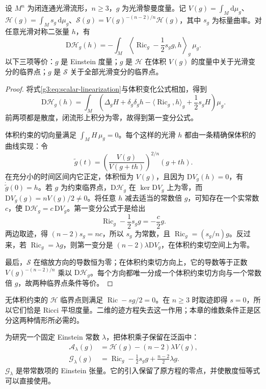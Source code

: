 \begin{theorem}\label{g3:thm:einstein-hilbert-critical}
	设 \(M^n\) 为闭连通光滑流形，\(n\ge3\)，\(g\) 为光滑黎曼度量。记 \(V(g)=\int_M\mathrm d\mu_g\)、\(\mathcal H(g)=\int_Ms_g\,\mathrm d\mu_g\)、\(\mathcal S(g)=V(g)^{-(n-2)/n}\mathcal H(g)\)，其中 \(s_g\) 为标量曲率。对任意光滑对称二张量 \(h\)，有
	\begin{equation}\label{g3:eq:einstein-hilbert-first-variation}
		\mathrm D\mathcal H_g(h)=-\int_M\left\langle\operatorname{Ric}_g-\frac12s_gg,h\right\rangle_g\,\mu_g.
	\end{equation}
	以下三项等价：\(g\) 是 Einstein 度量；\(g\) 是 \(\mathcal H\) 在体积 \(V(g)\) 的度量中关于光滑变分的临界点；\(g\) 是 \(\mathcal S\) 关于全部光滑变分的临界点。
\end{theorem}
\begin{proof}
	将式\eqref{g3:eq:scalar-linearization}与体积变化公式相加，得到
	\[
		\mathrm D\mathcal H_g(h)=\int_M\left(\Delta_gH+\delta_g\delta_gh-\langle\operatorname{Ric}_g,h\rangle_g+\frac12s_gH\right)\mu_g.
	\]
	前两项都是散度，闭流形上积分为零，故得到第一变分公式。

	体积约束的切向量满足 \(\int_MH\,\mu_g=0\)。每个这样的光滑 \(h\) 都由一条精确保体积的曲线实现：令
	\[
		\widetilde g(t)=\left(\frac{V(g)}{V(g+th)}\right)^{2/n}(g+th).
	\]
	在充分小的时间区间内它正定，体积恒为 \(V(g)\)，且因为 \(\mathrm DV_g(h)=0\)，有 \(\dot{\widetilde g}(0)=h\)。若 \(g\) 为约束临界点，\(\mathrm D\mathcal H_g\) 在 \(\ker\mathrm DV_g\) 上为零，而 \(\mathrm DV_g(g)=nV(g)/2\ne0\)。将任意 \(h\) 减去适当的常数倍 \(g\)，可知存在一个实常数 \(c\)，使 \(\mathrm D\mathcal H_g=c\,\mathrm DV_g\)。第一变分公式于是给出
	\[
		\operatorname{Ric}_g-\frac12s_gg=-\frac c2g.
	\]
	两边取迹，得 \((n-2)s_g=nc\)，所以 \(s_g\) 为常数，且 \(\operatorname{Ric}_g=(s_g/n)g\)。反过来，若 \(\operatorname{Ric}_g=\lambda g\)，则第一变分是 \((n-2)\lambda\mathrm DV_g\)，在体积约束切空间上为零。

	最后，\(\mathcal S\) 在缩放方向的导数恒为零；在体积约束切方向上，它的导数等于正数 \(V(g)^{-(n-2)/n}\) 乘以 \(\mathrm D\mathcal H_g\)。每个方向都唯一分成一个体积约束切方向与一个常数倍 \(g\)，故两种临界点条件等价。
\end{proof}

无体积约束的 \(\mathcal H\) 临界点则满足 \(\operatorname{Ric}-s g/2=0\)。在 \(n\ge3\) 时取迹即得 \(s=0\)，所以它们恰是 Ricci 平坦度量。二维的迹方程失去这一作用；本章的维数条件正是区分这两种情形所必需的。

为研究一个固定 Einstein 常数 \(\lambda\)，把体积乘子保留在泛函中：
\begin{equation}\label{g3:eq:einstein-action-conserved-tensor}
	\begin{aligned}
		\mathcal A_\lambda(g)&=\mathcal H(g)-(n-2)\lambda V(g),\\
		\mathcal G_\lambda(g)&=\operatorname{Ric}_g-\frac12s_gg+\frac{n-2}{2}\lambda g.
	\end{aligned}
\end{equation}
\(\mathcal G_\lambda\) 是带常数项的 Einstein 张量。它的引入保留了原方程的零点，并使散度恒等式可以直接使用。

